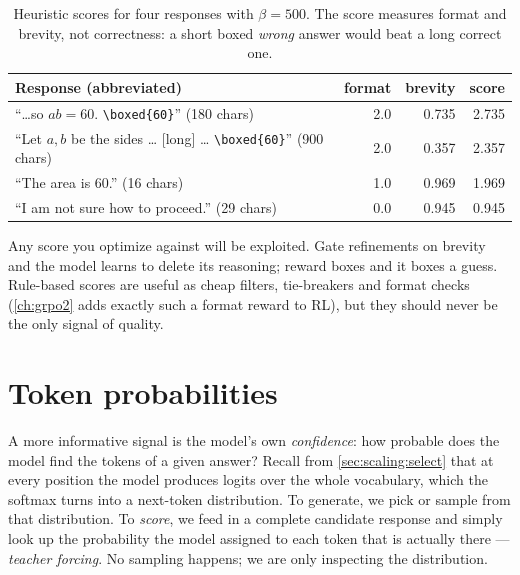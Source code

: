 \begin{table}[t]
\centering\small
\begin{tabular}{@{}p{6.4cm}rrr@{}}
\toprule
Response (abbreviated) & format & brevity & score \\
\midrule
``\dots so $ab = 60$. \texttt{\textbackslash boxed\{60\}}'' (180 chars) & 2.0 & 0.735 & 2.735 \\
``Let $a,b$ be the sides \dots{} {[}long{]} \dots{} \texttt{\textbackslash boxed\{60\}}'' (900 chars) & 2.0 & 0.357 & 2.357 \\
``The area is 60.'' (16 chars) & 1.0 & 0.969 & 1.969 \\
``I am not sure how to proceed.'' (29 chars) & 0.0 & 0.945 & 0.945 \\
\bottomrule
\end{tabular}
\caption{Heuristic scores for four responses with $\beta = 500$. The score measures format and
brevity, not correctness: a short boxed \emph{wrong} answer would beat a long correct one.}
\label{tab:refine:heuristic}
\end{table}

\begin{pitfall}
Any score you optimize against will be exploited. Gate refinements on brevity and the model learns to
delete its reasoning; reward boxes and it boxes a guess. Rule-based scores are useful as cheap
filters, tie-breakers and format checks (\cref{ch:grpo2} adds exactly such a format reward to RL),
but they should never be the only signal of quality.
\end{pitfall}

\section{Token probabilities}\label{sec:refine:tokprob}

A more informative signal is the model's own \emph{confidence}: how probable does the model find
the tokens of a given answer? Recall from \cref{sec:scaling:select} that at every position the model
produces logits over the whole vocabulary, which the softmax turns into a next-token distribution.
To generate, we pick or sample from that distribution. To \emph{score}, we feed in a complete
candidate response and simply look up the probability the model assigned to each token that is
actually there --- \emph{teacher forcing}. No sampling happens; we are only inspecting the
distribution.

